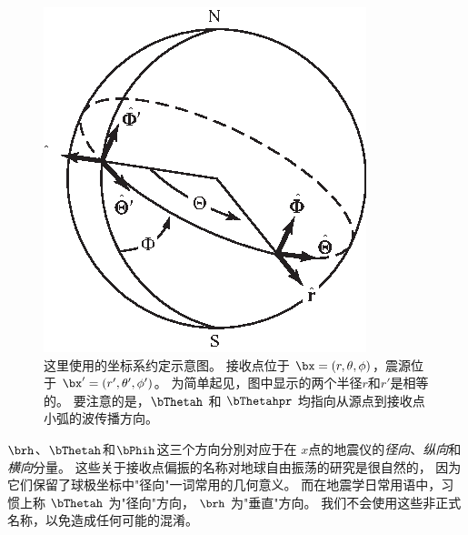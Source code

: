 \begin{figure}[t]
\centering
\includegraphics{../figures/chap10/fig01.eps}
\caption[SRgeometry]{
这里使用的坐标系约定示意图。
接收点位于 $\bx=(r,\theta,\phi)$，震源位于 $\bx'=(r',\theta',\phi')$。
为简单起见，图中显示的两个半径$r$和$r'$是相等的。
要注意的是，$\bThetah$ 和 $\bThetahpr$ 均指向从源点到接收点小弧的波传播方向。}
\label{10.fig.geom}
\end{figure}

$\brh$、$\bThetah$和$\bPhih$这三个方向分別对应于在
$x$点的地震仪的{\em 径向\/}、{\em 纵向\/}和{\em 横向\/}分量。
%
%
%
%
%
%
%
%
%
这些关于接收点偏振的名称对地球自由振荡的研究是很自然的，
因为它们保留了球极坐标中"径向"一词常用的几何意义。
而在地震学日常用语中，习惯上称 $\bThetah$ 为"径向"方向，
$\brh$ 为"垂直"方向。
我们不会使用这些非正式名称，以免造成任何可能的混淆。

